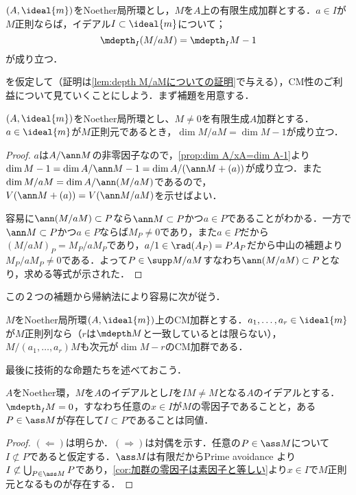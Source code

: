 \begin{lem}\label{lem:depth M/aM=depth M-1}
	$(A,\ideal{m})$をNoether局所環とし，$M$を$A$上の有限生成加群とする．$a\in I$が$M$正則ならば，イデアル$I\subset\ideal{m}$について；
	\[\mdepth_I (M/aM)=\mdepth_I M-1\]
	が成り立つ．
\end{lem}

を仮定して（証明は\ref{lem:depth M/aMについての証明}で与える），CM性のご利益について見ていくことにしよう．まず補題を用意する．

\begin{lem}\label{lem:dim M/aM=dim M-1}
	$(A,\ideal{m})$をNoether局所環とし、$M\neq0$を有限生成$A$加群とする．$a\in\ideal{m}$が$M$正則元であるとき，$\dim M/aM=\dim M-1$が成り立つ．
\end{lem}

\begin{proof}
	$a$は$A/\ann M$の非零因子なので，\ref{prop:dim A/xA=dim A-1}より$\dim M-1=\dim A/\ann M-1=\dim A/(\ann M+(a))$が成り立つ．また$\dim M/aM=\dim A/\ann(M/aM)$であるので，$V(\ann M+(a))=V(\ann M/aM)$を示せばよい．
	
	容易に$\ann(M/aM)\subset P$なら$\ann M\subset P$かつ$a\in P$であることがわかる．一方で$\ann M\subset P$かつ$a\in P$ならば$M_P\neq0$であり，また$a\in P$だから$(M/aM)_P=M_P/aM_P$であり，$a/1\in\rad (A_P)=PA_P$だから中山の補題より$M_P/aM_P\neq0$である．よって$P\in\supp M/aM$すなわち$\ann(M/aM)\subset P$となり，求める等式が示された．
\end{proof}

この２つの補題から帰納法により容易に次が従う．
\begin{cor}\label{cor:CMの正則列による商もCM}
	$M$をNoether局所環$(A,\ideal{m})$上のCM加群とする．$a_1,\dots,a_r\in\ideal{m}$が$M$正則列なら（$r$は$\mdepth M$と一致しているとは限らない），$M/(a_1,\dots,a_r)M$も次元が$\dim M-r$のCM加群である．
\end{cor}

最後に技術的な命題たちを述べておこう．

\begin{lem}\label{lem:depth 0とass}
	$A$をNoether環，$M$を$A$のイデアルとし$I$を$IM\neq M$となる$A$のイデアルとする．$\mdepth_I M=0$，すなわち任意の$x\in I$が$M$の零因子であることと，ある$P\in\ass M$が存在して$I\subset P$であることは同値．
\end{lem}

\begin{proof}
	$(\Longleftarrow)$は明らか．$(\Longrightarrow)$は対偶を示す．任意の$P\in\ass M$について$I\not\subset P$であると仮定する．$\ass M$は有限だからPrime avoidance より$I\not\subset\bigcup_{P\in\ass M}P$であり，\ref{cor:加群の零因子は素因子と等しい}より$x\in I$で$M$正則元となるものが存在する．
\end{proof}

